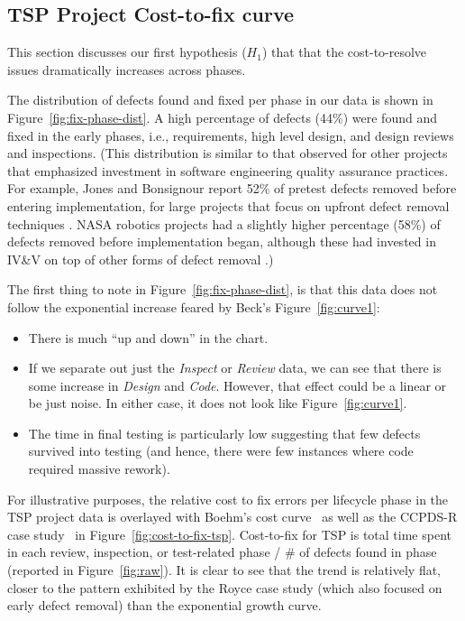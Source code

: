 \documentclass{sig-alternate}
\newcommand{\bi}{\begin{itemize}[leftmargin=0.4cm]}
\newcommand{\ei}{\end{itemize}}
\newcommand{\fig}[1]{Figure~\ref{fig:#1}}
\begin{document}
\subsection{TSP Project Cost-to-fix curve}
This section discusses our first hypothesis ($H_1$) that   that  the cost-to-resolve issues dramatically increases across phases.

The distribution of defects found and fixed per phase in our data is shown in Figure~\ref{fig:fix-phase-dist}. A high percentage of defects (44\%) were found and fixed in the early phases, i.e., requirements, high level design, and design reviews and inspections. (This distribution is similar to that observed for other projects that emphasized investment in software engineering quality assurance practices. For example, Jones and Bonsignour report 52\% of pretest defects removed before entering implementation, for large projects that focus on upfront defect removal techniques \cite{jones12}. NASA robotics projects had a slightly higher percentage (58\%) of defects removed before implementation began, although these had invested in IV\&V on top of other forms of defect removal \cite{me08a}.)  

The first thing to note in Figure~\ref{fig:fix-phase-dist}, 
is that this data does not follow the exponential increase feared by Beck's \fig{curve1}:
\bi
\item There is much ``up and down'' in the chart. 
\item If we separate out just the {\em Inspect} or {\em Review} data, we can see that there is some increase in {\em Design} and {\em Code}. However, that effect could be a linear or be just noise. In either case,
it does not look like \fig{curve1}.
\item The time in final testing is particularly low suggesting that few defects survived into testing
(and hence, there were few instances where code required massive rework).
\ei

For illustrative purposes, the relative cost to fix errors per lifecycle phase in the TSP project data is overlayed with Boehm's cost curve~\cite{Boehm81} as well as the CCPDS-R case study~\cite{Royce98} in \fig{cost-to-fix-tsp}. Cost-to-fix for TSP is total time spent in each review, inspection, or test-related phase / \# of defects found in phase (reported in \fig{raw}). It is clear to see that the trend is relatively flat, closer to the pattern exhibited by the Royce case study (which also focused on early defect removal) than the exponential growth curve.
\end{document}
